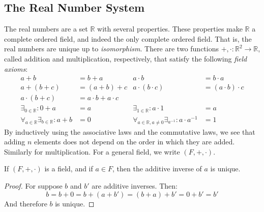         \subsection{The Real Number System}
            The real numbers are a set $\mathbb{R}$ with several
            properties. These properties make $\mathbb{R}$ a
            complete ordered field, and indeed the only complete
            ordered field. That is, the real numbers are unique
            up to \textit{isomorphism}. There are two functions
            $+,\cdot:\mathbb{R}^{2}\rightarrow\mathbb{R}$, called
            addition and multiplication, respectively, that satisfy
            the following \textit{field axioms}:
            \begin{align}
                a+b&=b+a&
                a\cdot{b}&=b\cdot{a}
                \tag{Commutativity}\\
                a+(b+c)&=(a+b)+c&
                a\cdot(b\cdot{c})&=(a\cdot{b})\cdot{c}
                \tag{Associativity}\\
                a\cdot(b+c)&=a\cdot{b}+a\cdot{c}
                \tag{Distributive Law}\\
                \exists_{0\in\mathbb{R}}:0+a&=a&
                \exists_{1\in\mathbb{R}}:a\cdot{1}&=a
                \tag{Neutral Elements}\\
                \forall_{a\in\mathbb{R}}\exists_{b\in\mathbb{R}}:
                a+b&=0&
                \forall_{a\in\mathbb{R},a\ne{0}}
                \exists_{a^{\minus{1}}}:
                a\cdot{a}^{\minus{1}}&=1
                \tag{Inverse Elements}
            \end{align}
            By inductively using the associative laws and the
            commutative laws, we see that adding $n$ elements
            does not depend on the order in which they are
            added. Similarly for multiplication. For a general
            field, we write $(F,+,\cdot)$.
            \begin{theorem}
                If $(F,+,\cdot)$ is a field, and if $a\in{F}$, then
                the additive inverse of $a$ is unique.
            \end{theorem}
            \begin{proof}
                For suppose $b$ and $b'$ are additive inverses. Then:
                \begin{equation}
                    b=b+0=b+(a+b')=(b+a)+b'=0+b'=b'
                \end{equation}
                And therefore $b$ is unique.
            \end{proof}
